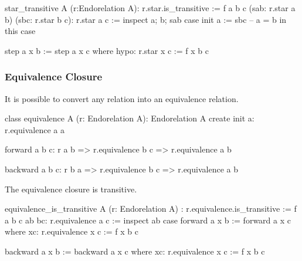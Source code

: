 \begin{alba}
    star_transitive A (r:Endorelation A): r.star.is_transitive :=
        f a b c (sab: r.star a b) (sbc: r.star b c): r.star a c :=
            inspect
                a; b; sab
            case
                init a :=
                    sbc  -- a = b in this case

                step a x b :=
                    step a x c where
                        hypo: r.star x c := f x b c
\end{alba}



\subsubsection{Equivalence Closure}

It is possible to convert any relation into an equivalence relation.



\begin{alba}
  class
    equivalence A (r: Endorelation A): Endorelation A
  create
    init a:
     r.equivalence a a

    forward a b c:
      r a b => r.equivalence b c => r.equivalence a b

    backward a b c:
      r b a => r.equivalence b c => r.equivalence a b
\end{alba}


The equivalence closure is transitive.

\begin{alba}
  equivalence_is_transitive
    A (r: Endorelation A)
    : r.equivalence.is_transitive :=
    f a b c ab bc: r.equivalence a c :=
      inspect ab case
        forward a x b :=
          forward a x c where
            xc: r.equivalence x c := f x b c

        backward a x b :=
          backward a x c where
            xc: r.equivalence x c := f x b c
\end{alba}

